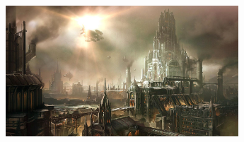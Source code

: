 \begin{minipage}{\textwidth}
	\begin{minipage}[c]{.49\textwidth}
	\includegraphics[width=\linewidth, height=4.9cm]{./images/Annexes/slide-02.jpg}
	\\[-1mm]
	
	\vspace{2mm}
	

\end{minipage}
\end{minipage}
